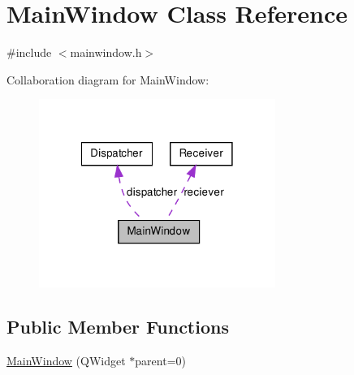 \hypertarget{class_main_window}{
\section{MainWindow Class Reference}
\label{class_main_window}
}


{\ttfamily \#include $<$mainwindow.h$>$}



Collaboration diagram for MainWindow:\nopagebreak
\begin{figure}[H]
\begin{center}
\leavevmode
\includegraphics[width=218pt]{class_main_window__coll__graph}
\end{center}
\end{figure}
\subsection*{Public Member Functions}
\begin{DoxyCompactItemize}
\item 
\hyperlink{class_main_window_a8b244be8b7b7db1b08de2a2acb9409db}{MainWindow} (QWidget $\ast$parent=0)
\end{DoxyCompactItemize}
